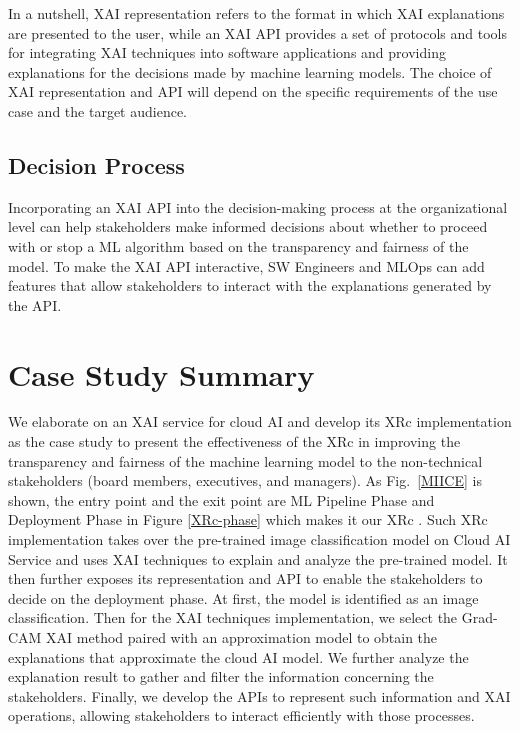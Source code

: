 \documentclass[conference]{IEEEtran}
\begin{document}
In a nutshell, XAI representation refers to the format in which XAI explanations are presented to the user, while an XAI API provides a set of protocols and tools for integrating XAI techniques into software applications and providing explanations for the decisions made by machine learning models. The choice of XAI representation and API will depend on the specific requirements of the use case and the target audience.
\subsection{Decision Process}
Incorporating an XAI API into the decision-making process at the organizational level can help stakeholders make informed decisions about whether to proceed with or stop a ML algorithm based on the transparency and fairness of the model. To make the XAI API interactive, SW Engineers and MLOps can add features that allow stakeholders to interact with the explanations generated by the API.

\section{Case Study Summary}

We elaborate on an XAI service for cloud AI and develop its XRc implementation as the case study to present the effectiveness of the XRc in improving the transparency and fairness of the machine learning model to the non-technical stakeholders (board members, executives, and managers). 
As Fig.~\ref{MIICE} is shown, the entry point and the exit point are ML Pipeline Phase and Deployment Phase in Figure \ref{XRc-phase} which makes it our XRc . Such XRc implementation takes over the pre-trained image classification model on Cloud AI Service and uses XAI techniques to explain and analyze the pre-trained model. It then further exposes its representation and API to enable the stakeholders to decide on the deployment phase. At first, the model is identified as an image classification. Then for the XAI techniques implementation, we select the Grad-CAM XAI method paired with an approximation model to obtain the explanations that approximate the cloud AI model. We further analyze the explanation result to gather and filter the information concerning the stakeholders. Finally, we develop the APIs to represent such information and XAI operations, allowing stakeholders to interact efficiently with those processes.
\end{document}

